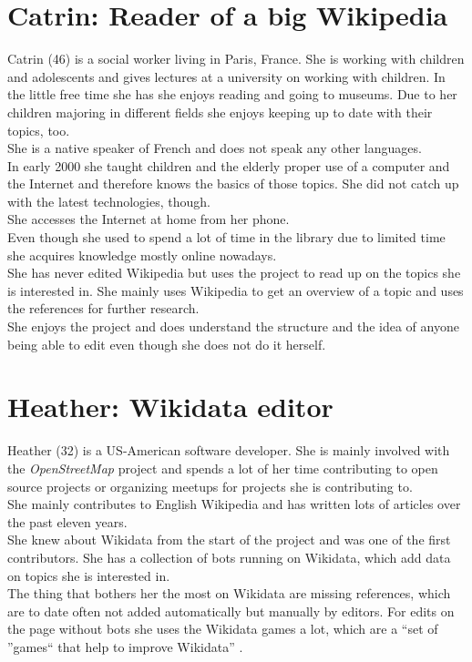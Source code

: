 \section{Catrin: Reader of a big Wikipedia}
Catrin (46) is a social worker living in Paris, France. She is working with children and adolescents and gives lectures at a university on working with children. In the little free time she has she enjoys reading and going to museums. Due to her children majoring in different fields she enjoys keeping up to date with their topics, too. \\
She is a native speaker of French and does not speak any other languages. \\
In early 2000 she taught children and the elderly proper use of a computer and the Internet and therefore knows the basics of those topics. She did not catch up with the latest technologies, though. \\
She accesses the Internet at home from her phone. \\
Even though she used to spend a lot of time in the library due to limited time she acquires knowledge mostly online nowadays. \\
She has never edited Wikipedia but uses the project to read up on the topics she is interested in. She mainly uses Wikipedia to get an overview of a topic and uses the references for further research. \\
She enjoys the project and does understand the structure and the idea of anyone being able to edit even though she does not do it herself. \\


\section{Heather: Wikidata editor}
Heather (32) is a US-American software developer. She is mainly involved with the \textit{OpenStreetMap} project and spends a lot of her time contributing to open source projects or organizing meetups for projects she is contributing to. \\
She mainly contributes to English Wikipedia and has written lots of articles over the past eleven years. \\
She knew about Wikidata from the start of the project and was one of the first contributors. She has a collection of bots running on Wikidata, which add data on topics she is interested in. \\
The thing that bothers her the most on Wikidata are missing references, which are to date often not added automatically but manually by editors. For edits on the page without bots she uses the Wikidata games a lot, which are a ``set of ''games`` that help to improve Wikidata'' \citep{wikidatagame}.
